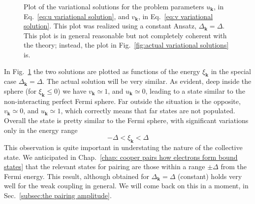 \begin{figure}
	\centering
	
	\caption{Plot of the variational solutions for the problem parameters $u_\mathbf{k}$, in Eq.~\eqref{eq:u variational solution}, and $v_\mathbf{k}$, in Eq.~\eqref{eq:v variational solution}. This plot was realized using a constant Ansatz, $\Delta_\mathbf{k} = \Delta$. This plot is in general reasonable but not completely coherent with the theory; instead, the plot in Fig.~\ref{fig:actual variational solutions} is.}
	\label{fig:variational solutions}
\end{figure}

In Fig.~\ref{fig:variational solutions} the two solutions are plotted as functions of the energy $\xi_\mathbf{k}$ in the special case $\Delta_\mathbf{k} = \Delta$. The actual solution will be very similar. As evident, deep inside the sphere (for $\xi_\mathbf{k}\le0$) we have $v_\mathbf{k} \simeq 1$, and $u_\mathbf{k} \simeq 0$, leading to a state similar to the non-interacting perfect Fermi sphere. Far outside the situation is the opposite, $v_\mathbf{k} \simeq 0$, and $u_\mathbf{k} \simeq 1$, which correctly means that far states are not populated. Overall the state is pretty similar to the Fermi sphere, with significant variations only in the energy range
\[
	- \Delta < \xi_\mathbf{k} < \Delta
\]
This observation is quite important in understating the nature of the collective state. We anticipated in Chap.~\ref{chap: cooper pairs how electrons form bound states} that the relevant states for pairing are those within a range $\pm\Delta$ from the Fermi energy. This result, although obtained for $\Delta_\mathbf{k} = \Delta$ (constant) holds very well for the weak coupling in general. We will come back on this in a moment, in Sec.~\ref{subsec:the pairing amplitude}.

